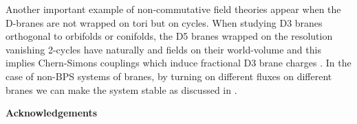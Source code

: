 \documentclass[a4paper,12pt]{article}
\begin{document}
Another important example of non-commutative field theories appear when the
D-branes are not wrapped on tori but on \coordHE{} cycles.
When studying D3 branes orthogonal to 
orbifolds or conifolds, the D5 branes wrapped on the resolution vanishing
2-cycles have naturally 
\coordHE{} and \coordHE{} fields on their world-volume and this implies  
Chern-Simons couplings which induce fractional D3 brane charges
\cite{do1,do2,kar,gi,dm2,k1,ot3,bere,ot4}.   
In the case of non-BPS systems of branes, by turning on different \coordHE{} fluxes on
different branes we can make the system stable as discussed in 
\cite{oz,ot5,kr1,li}. 

\vskip 3cm

\centerline{{\Large \bf Acknowledgements}}

\vskip 1cm
\end{document}
